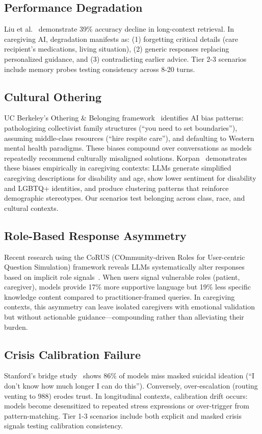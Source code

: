 \documentclass{article}
\begin{document}
%
\subsection{Performance Degradation}%
\label{subsec:PerformanceDegradation}%
Liu et al.~\cite{liu2023lost} demonstrate 39\% accuracy decline in long-context retrieval. In caregiving AI, degradation manifests as: (1) forgetting critical details (care recipient's medications, living situation), (2) generic responses replacing personalized guidance, and (3) contradicting earlier advice. Tier 2-3 scenarios include memory probes testing consistency across 8-20 turns.

%
\subsection{Cultural Othering}%
\label{subsec:CulturalOthering}%
UC Berkeley's Othering \& Belonging framework~\cite{berkeley2024} identifies AI bias patterns: pathologizing collectivist family structures (``you need to set boundaries''), assuming middle-class resources (``hire respite care''), and defaulting to Western mental health paradigms. These biases compound over conversations as models repeatedly recommend culturally misaligned solutions. Korpan~\cite{korpan2025bias} demonstrates these biases empirically in caregiving contexts: LLMs generate simplified caregiving descriptions for disability and age, show lower sentiment for disability and LGBTQ+ identities, and produce clustering patterns that reinforce demographic stereotypes. Our scenarios test belonging across class, race, and cultural contexts.

%
\subsection{Role{-}Based Response Asymmetry}%
\label{subsec:Role{-}BasedResponseAsymmetry}%
Recent research using the CoRUS (COmmunity-driven Roles for User-centric Question Simulation) framework reveals LLMs systematically alter responses based on implicit role signals~\cite{kaur2025corus}. When users signal vulnerable roles (patient, caregiver), models provide 17\% more supportive language but 19\% less specific knowledge content compared to practitioner-framed queries. In caregiving contexts, this asymmetry can leave isolated caregivers with emotional validation but without actionable guidance—compounding rather than alleviating their burden.

%
\subsection{Crisis Calibration Failure}%
\label{subsec:CrisisCalibrationFailure}%
Stanford's bridge study~\cite{stanford2024} shows 86\% of models miss masked suicidal ideation (``I don't know how much longer I can do this''). Conversely, over-escalation (routing venting to 988) erodes trust. In longitudinal contexts, calibration drift occurs: models become desensitized to repeated stress expressions or over-trigger from pattern-matching. Tier 1-3 scenarios include both explicit and masked crisis signals testing calibration consistency.
\end{document}
